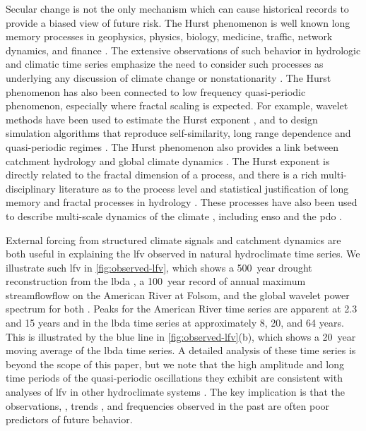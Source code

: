 \documentclass[
  draft,
  linenumbers
]{agujournal2019}
\begin{document}
Secular change is not the only mechanism which can cause historical records to provide a biased view of future risk.
The Hurst phenomenon is  well known   long memory  processes  in geophysics, physics, biology, medicine, traffic, network dynamics, and finance \citep{oconnell:2016}.
The extensive observations of such behavior in hydrologic and climatic time series emphasize the need to consider such processes as underlying any discussion of climate change or nonstationarity \citep{koutsoyiannis:2003,markonis:2013,Palmer:1993ef}.
The Hurst phenomenon has also been connected to low frequency quasi-periodic phenomenon, especially where fractal scaling is expected.
For example, wavelet methods have been used to estimate the Hurst exponent \citep{simonsen:1998,chamoli:2007}, and to design simulation algorithms that reproduce self-similarity, long range dependence and quasi-periodic regimes \citep{Kwon:2007fj,bullmore:2001,geweke:1983,feng:2005}.
The Hurst phenomenon also provides a link between catchment hydrology and global climate dynamics \citep{bloschl:2010,montanari:2003}.
The Hurst exponent is directly related to the fractal dimension of a process, and there is a rich multi-disciplinary literature as to the process level and statistical justification of long memory and fractal processes in hydrology \citep{mandelbrot:1985,mandelbrot:1969,beran:1994}.
These processes have also been used to describe multi-scale dynamics of the climate \citep{lovejoy:2012,lovejoy:2013a,lovejoy:2013,selvam:2017}, including \gls{enso} \citep{maruyama:2018,zivkovic:2013} and the \gls{pdo} \citep{Mantua:1997kj}.

External forcing from structured climate signals \citep[``teleconnections'';][]{Angstrom:1935ej} and catchment dynamics are both useful in explaining the \gls{lfv} observed in natural hydroclimate time series.
We illustrate such \gls{lfv} in \cref{fig:observed-lfv}, which shows a \SI{500}{year} drought reconstruction from the \gls{lbda} \citep{Cook:2010bz}, a \SI{100}{year} record of annual maximum streamflowflow on the American River at Folsom, and the global wavelet power spectrum for both \citep{Torrence:1998jp,Roesch:wlBQQoIs}.
Peaks for the American River time series are apparent at 2.3 and 15 years and in the \gls{lbda} time series at approximately 8, 20, and 64 years.
This is illustrated by the blue line in \cref{fig:observed-lfv}(b), which shows a \SI{20}{year} moving average of the \gls{lbda} time series.
A detailed analysis of these time series is beyond the scope of this paper, but we note that the high amplitude and long time periods of the quasi-periodic oscillations they exhibit are consistent with analyses of \gls{lfv} in other hydroclimate systems \citep{Kiem:2002kq,Swierczynski:2012km,Woollings:2014kd,Hodgkins:2017hw}.
The key implication is that the observations, \citep{Jain:2001hz}, trends \citep{bhattacharya:1983}, and frequencies \citep{newman:2016} observed in the past are often poor predictors of future behavior.
\end{document}
